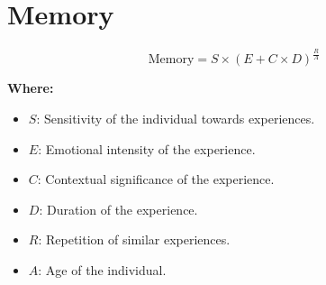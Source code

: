 \chapter{Memory}

\begin{equation}
\text{Memory} = S \times (E + C \times D)^\frac{R}{A}
\end{equation}

\textbf{Where:}

\begin{itemize}
    \item $S$: Sensitivity of the individual towards experiences.
    \item $E$: Emotional intensity of the experience.
    \item $C$: Contextual significance of the experience.
    \item $D$: Duration of the experience.
    \item $R$: Repetition of similar experiences.
    \item $A$: Age of the individual.
\end{itemize}